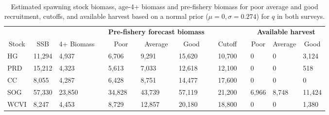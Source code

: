 %
\begin{table}[!tbp]
 \small
 \caption{Estimated spawning stock biomass,  age-4+ biomass and pre-fishery biomass for poor average and good recruitment,  cutoffs, and available harvest based on a normal prior ($\mu=0,\sigma=0.274$) for $q$ in both surveys.\label{TableCatchAdvice}} 
 \begin{center}
 \begin{tabular}{lllclllclclll}\hline\hline
\multicolumn{3}{c}{\bfseries }&
\multicolumn{1}{c}{\bfseries }&
\multicolumn{3}{c}{\bfseries Pre-fishery forecast biomass}&
\multicolumn{1}{c}{\bfseries }&
\multicolumn{1}{c}{\bfseries }&
\multicolumn{1}{c}{\bfseries }&
\multicolumn{3}{c}{\bfseries Available harvest}
\tabularnewline \cline{1-13}
\multicolumn{1}{c}{Stock}&\multicolumn{1}{c}{SSB}&\multicolumn{1}{c}{4+ Biomass}&\multicolumn{1}{c}{}&\multicolumn{1}{c}{Poor}&\multicolumn{1}{c}{Average}&\multicolumn{1}{c}{Good}&\multicolumn{1}{c}{}&\multicolumn{1}{c}{Cutoff}&\multicolumn{1}{c}{}&\multicolumn{1}{c}{Poor}&\multicolumn{1}{c}{Average}&\multicolumn{1}{c}{Good}\tabularnewline
\hline
HG&11,294& 4,937&& 6,706& 9,291&15,620&&10,700&&     0&     0& 3,124\tabularnewline
PRD&15,212& 4,323&& 5,613& 7,033&12,618&&12,100&&     0&     0&   518\tabularnewline
CC& 8,055& 4,287&& 6,428& 8,751&14,477&&17,600&&     0&     0&     0\tabularnewline
SOG&57,330&23,850&&34,828&43,739&57,119&&21,200&& 6,966& 8,748&11,424\tabularnewline
WCVI& 8,247& 4,453&& 8,729&12,857&20,180&&18,800&&     0&     0& 1,380\tabularnewline
\hline
\end{tabular}

\end{center}

\end{table}

